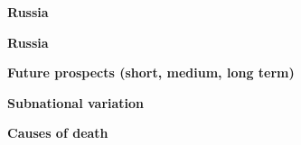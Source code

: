 \documentclass[xcolor={dvipsnames}]{beamer}
\begin{document}
\begin{frame}
	\LARGE{	
	\begin{center}
	
	\textbf{Russia}
	\hspace*{-1cm}
		
	\end{center}
		}
\end{frame}


\begin{frame}
	\LARGE{	
	\begin{center}
	
	\textbf{Russia}
	\hspace*{-1cm}
		
	\end{center}
		}
\end{frame}



\begin{frame}
	\begin{center}
	
			\LARGE{\textbf{Future prospects (short, medium, long term)}\linebreak \\ \pause
			
			\textbf{Subnational variation} \linebreak \\ \pause
			
			\textbf{Causes of death}}
		
	\end{center}
\end{frame}
\end{document}
